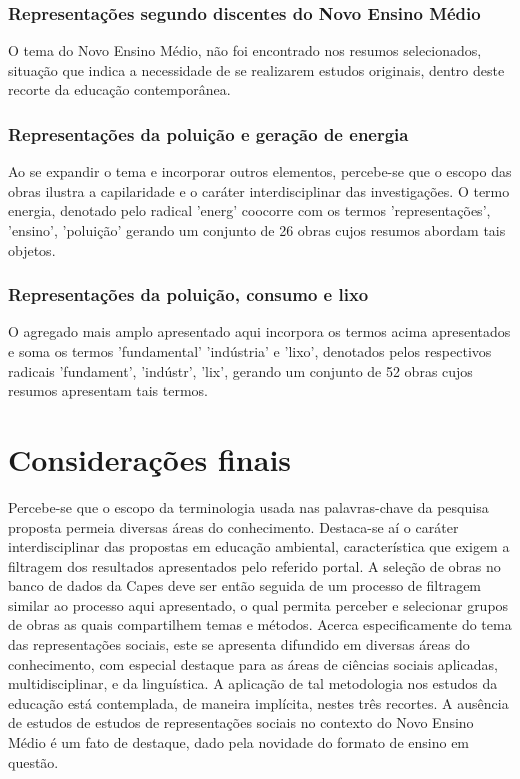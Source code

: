 \documentclass[
   article,       %
   11pt,          %
   oneside,       %
   a4paper,       %
   english,       %
   brazil,           %
   sumario=tradicional
   ]{abntex2}
\begin{document}
\subsubsection{Representações segundo discentes do Novo Ensino Médio}
O tema do Novo Ensino Médio, não foi encontrado nos resumos selecionados, situação que indica a necessidade de se realizarem estudos originais, dentro deste recorte da educação contemporânea.


\subsubsection{Representações da poluição e geração de energia}
Ao se expandir o tema e incorporar outros elementos, percebe-se que o escopo das obras ilustra a capilaridade e o caráter interdisciplinar das investigações. O termo energia, denotado pelo radical 'energ' coocorre com os termos 'representações', 'ensino', 'poluição' gerando um conjunto de 26 obras cujos resumos abordam tais objetos.

\subsubsection{Representações da poluição, consumo e lixo}
O agregado mais amplo apresentado aqui incorpora os termos acima apresentados e soma os termos 'fundamental' 'indústria' e 'lixo', denotados pelos respectivos radicais
'fundament', 'indústr', 'lix', gerando um conjunto de 52 obras cujos resumos apresentam tais termos.


\section{Considerações finais}

Percebe-se que o escopo da terminologia usada nas palavras-chave da pesquisa proposta permeia diversas áreas do conhecimento. Destaca-se aí o caráter interdisciplinar das propostas em educação ambiental, característica que exigem a filtragem dos resultados apresentados pelo referido portal. A seleção de obras no banco de dados da Capes deve ser então seguida de um processo de filtragem similar ao processo aqui apresentado, o qual permita perceber e selecionar grupos de obras as quais compartilhem temas e métodos. Acerca especificamente do tema das representações sociais, este se apresenta difundido em diversas áreas do conhecimento, com especial destaque para as áreas de ciências sociais aplicadas, multidisciplinar, e da linguística. A aplicação de tal metodologia nos estudos da educação está contemplada, de maneira implícita, nestes três recortes. A ausência de estudos de estudos de representações sociais no contexto do Novo Ensino Médio é um fato de destaque, dado pela novidade do formato de ensino em questão.
\end{document}

